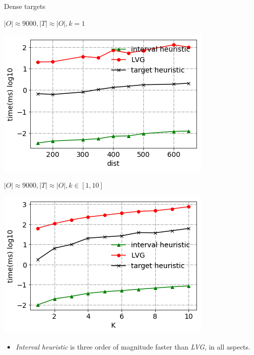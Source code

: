 \begin{frame}{Dense targets}
\begin{minipage}{.5\textwidth}
    \centering
    $\scriptscriptstyle |O| \approx 9000, |T| \approx |O|, k=1$
    \begin{adjustbox}{max totalsize={.9\textwidth}{.9\textheight}, right}
    \centering
    \includegraphics{pic/e1_dense_time.png}
    \end{adjustbox}
\end{minipage}%
\begin{minipage}{.5\textwidth}
    \centering
    $\scriptscriptstyle |O| \approx 9000, |T| \approx |O|, k \in [1, 10]$
    \begin{adjustbox}{max totalsize={.9\textwidth}{.9\textheight}, right}
    \centering
    \includegraphics{pic/e2_dense_time.png}
    \end{adjustbox}
\end{minipage}
\begin{itemize}
    \item \small{\textit{Interval heuristic} is three order of magnitude faster than \textit{LVG}, in all aspects.}
\end{itemize}
\end{frame}

